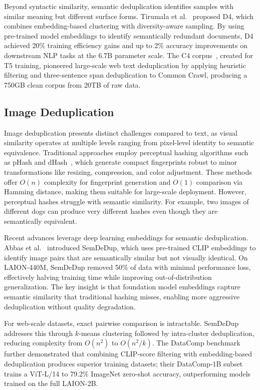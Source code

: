 \documentclass[conference]{IEEEtran}
\begin{document}
Beyond syntactic similarity, semantic deduplication identifies samples with similar meaning but different surface forms. Tirumala et al.~\cite{tirumala2023d4} proposed D4, which combines embedding-based clustering with diversity-aware sampling. By using pre-trained model embeddings to identify semantically redundant documents, D4 achieved 20\% training efficiency gains and up to 2\% accuracy improvements on downstream NLP tasks at the 6.7B parameter scale. The C4 corpus~\cite{raffel2020exploring}, created for T5 training, pioneered large-scale web text deduplication by applying heuristic filtering and three-sentence span deduplication to Common Crawl, producing a 750GB clean corpus from 20TB of raw data.



\subsection{Image Deduplication}

Image deduplication presents distinct challenges compared to text, as visual similarity operates at multiple levels ranging from pixel-level identity to semantic equivalence. Traditional approaches employ perceptual hashing algorithms such as pHash and dHash~\cite{zauner2010implementation}, which generate compact fingerprints robust to minor transformations like resizing, compression, and color adjustment. These methods offer $O(n)$ complexity for fingerprint generation and $O(1)$ comparison via Hamming distance, making them suitable for large-scale deployment. However, perceptual hashes struggle with semantic similarity. For example, two images of different dogs can produce very different hashes even though they are semantically equivalent.

Recent advances leverage deep learning embeddings for semantic deduplication. Abbas et al.~\cite{abbas2023semdedup} introduced SemDeDup, which uses pre-trained CLIP embeddings to identify image pairs that are semantically similar but not visually identical. On LAION-440M, SemDeDup removed 50\% of data with minimal performance loss, effectively halving training time while improving out-of-distribution generalization. The key insight is that foundation model embeddings capture semantic similarity that traditional hashing misses, enabling more aggressive deduplication without quality degradation.

For web-scale datasets, exact pairwise comparison is intractable. SemDeDup addresses this through $k$-means clustering followed by intra-cluster deduplication, reducing complexity from $O(n^2)$ to $O(n^2/k)$. 
The DataComp benchmark~\cite{gadre2023datacomp} further demonstrated that combining CLIP-score filtering with embedding-based deduplication produces superior training datasets; their DataComp-1B subset trains a ViT-L/14 to 79.2\% ImageNet zero-shot accuracy, outperforming models trained on the full LAION-2B.
\end{document}
